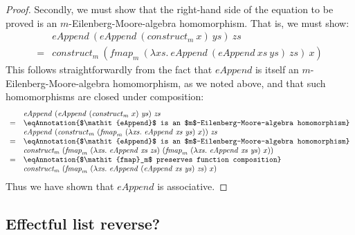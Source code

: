 \begin{proof}
  Secondly, we must show that the right-hand side of the equation to
  be proved is an $m$-Eilenberg-Moore-algebra homomorphism. That is,
  we must show:
  \begin{displaymath}
    \begin{array}{cl}
      &\mathit{eAppend}~(\mathit{eAppend}~(\mathit{construct}_m~x)~\mathit{ys})~\mathit{zs} \\
      =&\mathit{construct}_m~(\mathit{fmap}_m~(\lambda \mathit{xs}.~\mathit{eAppend}~(\mathit{eAppend}~\mathit{xs}~\mathit{ys})~\mathit{zs})~x)
    \end{array}
  \end{displaymath}
  This follows straightforwardly from the fact that $\mathit{eAppend}$
  is itself an $m$-Eilenberg-Moore-algebra homomorphism, as we noted
  above, and that such homomorphisms are closed under composition:
  \begin{displaymath}
    \begin{array}{cl}
      & \mathit{eAppend}~(\mathit{eAppend}~(\mathit{construct}_m~x)~\mathit{ys})~\mathit{zs} \\
      =&\eqAnnotation{$\mathit{eAppend}$ is an $m$-Eilenberg-Moore-algebra homomorphism} \\
      & \mathit{eAppend}~(\mathit{construct}_m~(\mathit{fmap}_m~(\lambda \mathit{xs}.~\mathit{eAppend}~\mathit{xs}~\mathit{ys})~x))~\mathit{zs} \\
      =&\eqAnnotation{$\mathit{eAppend}$ is an $m$-Eilenberg-Moore-algebra homomorphism} \\
      & \mathit{construct_m}~(\mathit{fmap}_m~(\lambda \mathit{xs}.~\mathit{eAppend}~\mathit{xs}~\mathit{zs})~(\mathit{fmap}_m~(\lambda \mathit{xs}.~\mathit{eAppend}~\mathit{xs}~\mathit{ys})~x)) \\
      =&\eqAnnotation{$\mathit{fmap}_m$ preserves function composition} \\
      & \mathit{construct_m}~(\mathit{fmap}_m~(\lambda \mathit{xs}.~\mathit{eAppend}~(\mathit{eAppend}~\mathit{xs}~\mathit{ys})~\mathit{zs})~x)
    \end{array}
  \end{displaymath}
  Thus we have shown that $\mathit{eAppend}$ is associative.
\end{proof}

\subsection{Effectful list reverse?}

